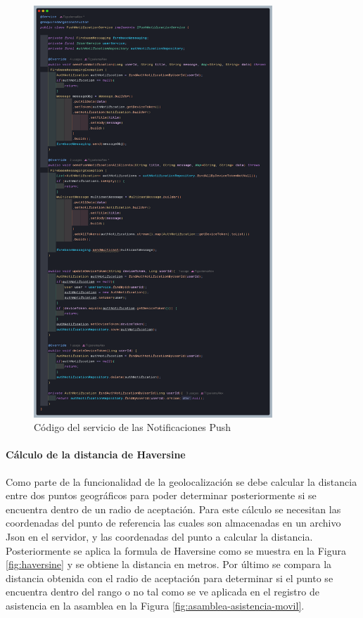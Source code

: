 \begin{figure}[H]
    \centering
    \includegraphics[width=0.8\textwidth]{resources/images/pushNotification}
    \caption{Código del servicio de las Notificaciones Push}
    \label{fig:pushNotification-service}
\end{figure}

\paragraph{Cálculo de la distancia de Haversine}

Como parte de la funcionalidad de la geolocalización se debe calcular la distancia entre dos puntos geográficos para poder determinar posteriormente si se encuentra dentro de un radio de aceptación.
Para este cálculo se necesitan las coordenadas del punto de referencia las cuales son almacenadas en un archivo Json en el servidor, y las coordenadas del punto a calcular la distancia.
Posteriormente se aplica la formula de Haversine como se muestra en la Figura \ref{fig:haversine} y se obtiene la distancia en metros.
Por último se compara la distancia obtenida con el radio de aceptación para determinar si el punto se encuentra dentro del rango o no tal como se ve aplicada en el registro de asistencia en la asamblea en la Figura \ref{fig:asamblea-asistencia-movil}.

